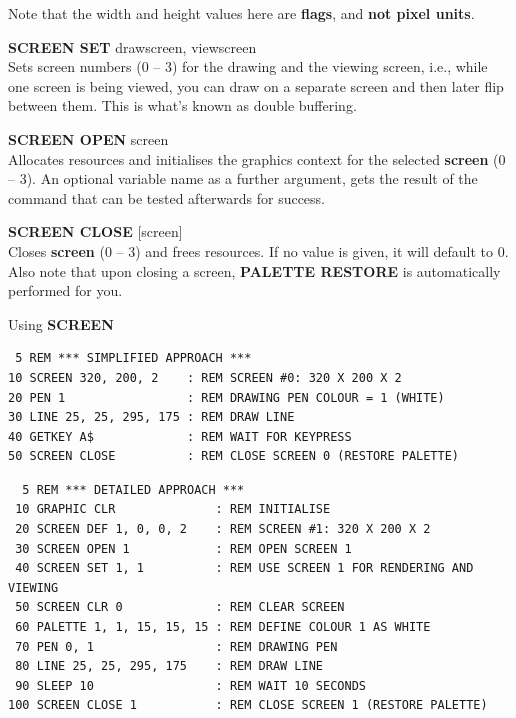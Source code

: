 \begin{description}[leftmargin=2cm,style=nextline]
                  Note that the width and height values here are {\bf flags}, and {\bf not pixel units}.

                  {\bf SCREEN SET} drawscreen, viewscreen \\
                  Sets screen numbers (0 -- 3) for the drawing and the viewing screen, i.e., while one screen is being viewed, you can draw on a separate screen and then later flip between them. This is what's known as double buffering.

                  {\bf SCREEN OPEN} screen \\
                  Allocates resources and initialises the graphics context for the selected {\bf screen} (0 -- 3).  An optional variable name as a further argument, gets the result of the command that can be tested afterwards for success.

                  {\bf SCREEN CLOSE} [screen] \\
                  Closes {\bf screen} (0 -- 3) and frees resources. If no value is given, it will default to 0. Also note that upon closing a screen, {\bf PALETTE RESTORE} is automatically performed for you.

\item [Examples:] Using {\bf SCREEN}

\begin{tcolorbox}[colback=black,coltext=white]
\verbatimfont{\codefont}
\begin{verbatim}
 5 REM *** SIMPLIFIED APPROACH ***
10 SCREEN 320, 200, 2    : REM SCREEN #0: 320 X 200 X 2
20 PEN 1                 : REM DRAWING PEN COLOUR = 1 (WHITE)
30 LINE 25, 25, 295, 175 : REM DRAW LINE
40 GETKEY A$             : REM WAIT FOR KEYPRESS
50 SCREEN CLOSE          : REM CLOSE SCREEN 0 (RESTORE PALETTE)
\end{verbatim}
\end{tcolorbox}

\begin{tcolorbox}[colback=black,coltext=white]
\verbatimfont{\codefont}
\begin{verbatim}
  5 REM *** DETAILED APPROACH ***
 10 GRAPHIC CLR              : REM INITIALISE
 20 SCREEN DEF 1, 0, 0, 2    : REM SCREEN #1: 320 X 200 X 2
 30 SCREEN OPEN 1            : REM OPEN SCREEN 1
 40 SCREEN SET 1, 1          : REM USE SCREEN 1 FOR RENDERING AND VIEWING
 50 SCREEN CLR 0             : REM CLEAR SCREEN
 60 PALETTE 1, 1, 15, 15, 15 : REM DEFINE COLOUR 1 AS WHITE
 70 PEN 0, 1                 : REM DRAWING PEN
 80 LINE 25, 25, 295, 175    : REM DRAW LINE
 90 SLEEP 10                 : REM WAIT 10 SECONDS
100 SCREEN CLOSE 1           : REM CLOSE SCREEN 1 (RESTORE PALETTE)
\end{verbatim}
\end{tcolorbox}
\end{description}

